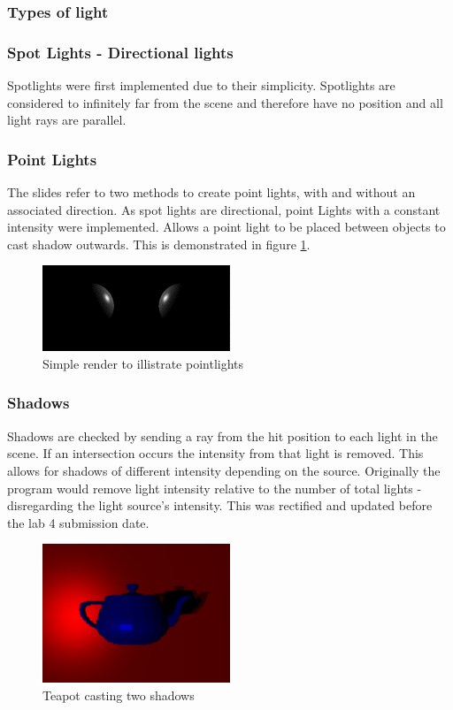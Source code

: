 \documentclass{article}
\begin{document}
\subsubsection{Types of light}
\subsubsection{Spot Lights - Directional lights}
Spotlights were first implemented due to their simplicity. Spotlights are considered to infinitely far from the scene and therefore have no position and all light rays are parallel.

\subsubsection{Point Lights}
The slides refer to two methods to create point lights, with and without an associated direction. As spot lights are directional, point Lights with a constant intensity were implemented. Allows a point light to be placed between objects to cast shadow outwards. This is demonstrated in figure \ref{fig:pointlight_white}. 
\begin{figure}[h]
\centering
\includegraphics[width=0.5\textwidth]{pointlight}
\captionsetup{justification=centering,margin=0.5cm}
\caption{Simple render to illistrate pointlights}
\label{fig:pointlight_white}
\end{figure}

\subsubsection{Shadows}
Shadows are checked by sending a ray from the hit position to each light in the scene. If an intersection occurs the intensity from that light is removed. This allows for shadows of different intensity depending on the source. Originally the program would remove light intensity relative to the number of total lights - disregarding the light source's intensity. This was rectified and updated before the lab 4 submission date.

\begin{figure}[h]
\centering
\includegraphics[width=0.5\textwidth]{teapotShadow}
\captionsetup{justification=centering,margin=0.5cm}
\caption{Teapot casting two shadows}
\label{fig:teapotShadow}
\end{figure}
\end{document}
